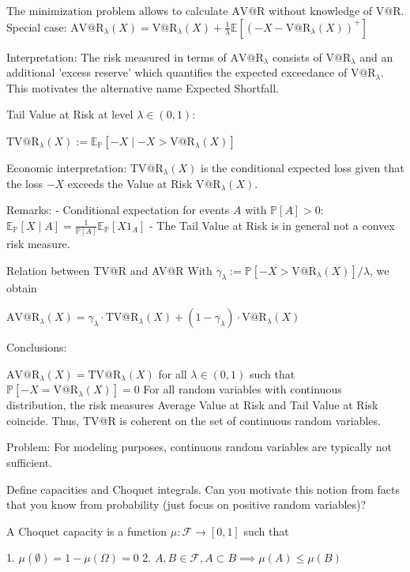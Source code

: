 {The minimization problem allows to calculate \(\text{AV@R}\) 
without knowledge of \(\text{V@R}\).
Special case:
\(
\text{AV@R}_\lambda(X) = \text{V@R}_\lambda(X) + \frac{1}{\lambda} \mathbb{E}[(-X - \text{V@R}_\lambda(X))^+]
\)

Interpretation: The risk measured in terms of \(\text{AV@R}_\lambda\) consists of \(\text{V@R}_\lambda\) 
and an additional 'excess reserve' which quantifies the expected exceedance of \(\text{V@R}_\lambda\). 
This motivates the alternative name Expected Shortfall.

Tail Value at Risk at level \(\lambda \in (0,1)\):

\(
\text{TV@R}_\lambda(X) := \mathbb{E}_{\mathbb{P}}[-X \mid -X > \text{V@R}_\lambda(X)]
\)

Economic interpretation:
\(\text{TV@R}_\lambda(X)\) is the conditional expected loss given that the loss \(-X\) exceeds the Value at Risk \(\text{V@R}_\lambda(X)\).

Remarks:
- Conditional expectation for events \(A\) with \(\mathbb{P}[A] > 0\):
  \(
  \mathbb{E}_{\mathbb{P}}[X \mid A] = \frac{1}{\mathbb{P}[A]} \mathbb{E}_{\mathbb{P}}[X 1_A]
  \)
- The Tail Value at Risk is in general not a convex risk measure.

Relation between TV@R and AV@R
With \(\gamma_\lambda := \mathbb{P}[-X > \text{V@R}_\lambda(X)]/\lambda\), we obtain

\(
\text{AV@R}_\lambda(X) = \gamma_\lambda \cdot \text{TV@R}_\lambda(X) + (1 - \gamma_\lambda) \cdot \text{V@R}_\lambda(X)
\)

Conclusions:

\(\text{AV@R}_\lambda(X) = \text{TV@R}_\lambda(X)\) for all \(\lambda \in (0,1)\) 
such that \(\mathbb{P}[-X = \text{V@R}_\lambda(X)] = 0\)
For all random variables with continuous distribution, 
the risk measures Average Value at Risk and Tail Value at Risk coincide.
Thus, TV@R is coherent on the set of continuous random variables.

Problem:
For modeling purposes, continuous random variables are typically not sufficient.

Define capacities and Choquet integrals. Can you motivate this notion from facts
that you know from probability (just focus on positive random variables)?

A Choquet capacity is a function \(\mu: \mathcal{F} \rightarrow [0, 1]\) such that

1. \(\mu(\emptyset) = 1 - \mu(\Omega) = 0\)
2. \(A, B \in \mathcal{F}, A \subset B \implies \mu(A) \le \mu(B)\)

}
